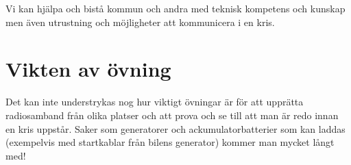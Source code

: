 Vi kan hjälpa och bistå kommun och andra med teknisk kompetens och kunskap men
även utrustning och möjligheter att kommunicera i en kris.

\section{Vikten av övning}

Det kan inte understrykas nog hur viktigt övningar är för att upprätta
radiosamband från olika platser och att prova och se till att man är redo
innan en kris uppstår. Saker som generatorer och ackumulatorbatterier som kan
laddas (exempelvis med startkablar från bilens generator) kommer man mycket
långt med!

